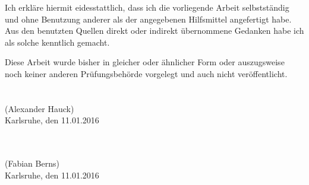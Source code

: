 Ich erkläre hiermit eidesstattlich, dass ich die vorliegende Arbeit selbstständig und ohne Benutzung anderer als der angegebenen Hilfsmittel angefertigt habe.
Aus den benutzten Quellen direkt oder indirekt übernommene Gedanken habe ich als solche kenntlich gemacht.

Diese Arbeit wurde bisher in gleicher oder ähnlicher Form oder auszugsweise noch keiner anderen Prüfungsbehörde vorgelegt und auch nicht veröffentlicht.
\\
\vspace{2cm}
\\
\underline{\hspace{5cm}}\\
\noindent (Alexander Hauck)
\\
\noindent Karlsruhe, den 11.01.2016

\leavevmode
\vspace{2cm}
\\
\underline{\hspace{5cm}}\\
\noindent (Fabian Berns)
\\
\noindent Karlsruhe, den 11.01.2016